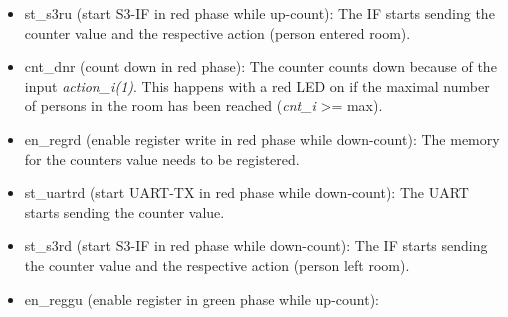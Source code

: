 \begin{itemize}
  \item st\_s3ru (start S3-IF in red phase while up-count): The IF starts sending the counter value and the respective action (person entered room).
  \item cnt\_dnr (count down in red phase): The counter counts down because of the input \textit{action\_i(1)}. This happens with a red LED on if the maximal number of persons in the room has been reached (\textit{cnt\_i} >= max).
   \item en\_regrd (enable register write in red phase while down-count): The memory for the counters value needs to be registered.
  \item st\_uartrd (start UART-TX in red phase while down-count): The UART starts sending the counter value.
  \item st\_s3rd (start S3-IF in red phase while down-count): The IF starts sending the counter value and the respective action (person left room).
  \item en\_reggu (enable register in green phase while up-count):
\end{itemize}
